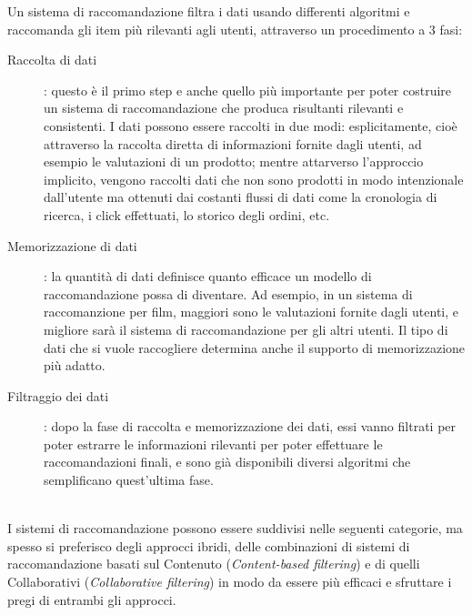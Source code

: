 Un sistema di raccomandazione filtra i dati usando differenti algoritmi e raccomanda gli item più rilevanti agli utenti, attraverso 
un procedimento a 3 fasi:
\begin{description}
	\item[Raccolta di dati]: questo è il primo step e anche quello più importante per poter costruire un sistema di 
	raccomandazione che produca risultanti rilevanti e consistenti. I dati possono essere raccolti in due modi: esplicitamente,
	cioè attraverso la raccolta diretta di informazioni fornite dagli utenti, ad esempio le valutazioni di un prodotto; mentre 
	attarverso l'approccio implicito, vengono raccolti dati che non sono prodotti in modo intenzionale dall'utente ma ottenuti
	dai costanti flussi di dati come la cronologia di ricerca, i click effettuati, lo storico degli ordini, etc.
	\item[Memorizzazione di dati]: la quantità di dati definisce quanto efficace un modello di raccomandazione possa di
	diventare. Ad esempio, in un sistema di raccomanzione per film, maggiori sono le valutazioni fornite dagli utenti, e 
	migliore sarà il sistema di raccomandazione per gli altri utenti. Il tipo di dati che si vuole raccogliere determina
	anche il supporto di memorizzazione più adatto.   
	\item[Filtraggio dei dati]: dopo la fase di raccolta e memorizzazione dei dati, essi vanno filtrati per poter estrarre
	le informazioni rilevanti per poter effettuare le raccomandazioni finali, e sono già disponibili diversi algoritmi che
	semplificano quest'ultima fase. 
\end{description}
\ \\
I sistemi di raccomandazione possono essere suddivisi nelle seguenti categorie, ma spesso si preferisco degli approcci ibridi, delle
combinazioni di sistemi di raccomandazione basati sul Contenuto (\textit{Content-based filtering}) e di
quelli Collaborativi (\textit{Collaborative filtering}) in modo da essere più efficaci e sfruttare i pregi di entrambi gli approcci.


